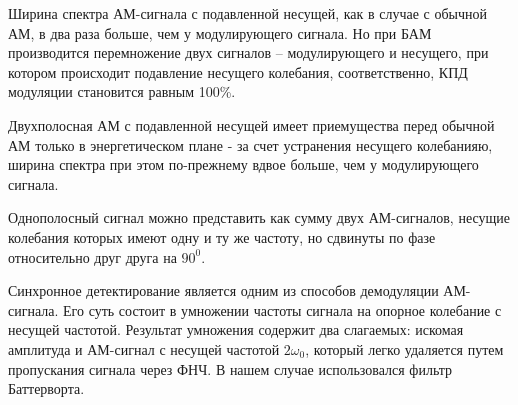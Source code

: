 \documentclass[10pt,a4paper]{report}
\begin{document}
Ширина спектра АМ-сигнала с подавленной несущей, как  в случае с обычной АМ, в два раза больше, чем у модулирующего сигнала. Но при БАМ производится перемножение двух сигналов – модулирующего и несущего, при котором происходит подавление несущего колебания, соответственно, КПД модуляции становится равным 100\%. 

Двухполосная АМ с подавленной несущей имеет приемущества перед обычной АМ только в энергетическом плане - за счет устранения несущего колебанияю, ширина спектра при этом по-прежнему вдвое больше, чем у модулирующего сигнала. 

Однополосный сигнал можно представить как сумму двух АМ-сигналов, несущие колебания которых имеют одну и ту же частоту, но сдвинуты по фазе относительно друг друга на $90^0$.

Синхронное детектирование является одним из способов демодуляции АМ-сигнала. Его суть состоит в умножении частоты сигнала на опорное колебание с несущей частотой. Результат умножения содержит два слагаемых: искомая амплитуда и АМ-сигнал с несущей частотой $2\omega_0$, который легко удаляется путем пропускания сигнала через ФНЧ. В нашем случае использовался фильтр Баттерворта.
\end{document}
